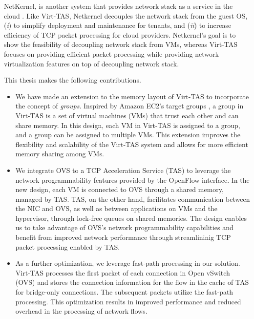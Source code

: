 NetKernel, is another system that provides network stack as a service in the cloud
\cite{niu2021netkernel, niu2017network}.
Like Virt-TAS, Netkernel decouples the network stack from the guest OS, 
(\emph{i}) to simplify deployment and maintenance for tenants, and (\emph{ii}) to increase  
efficiency of TCP packet processing for cloud providers. Netkernel's 
goal is to show the feasibility of decoupling network stack from VMs, whereas Virt-TAS
focuses on providing efficient packet processing while providing network virtualization 
features on top of decoupling network stack.

This thesis makes the following contributions.
\begin{itemize}
    \item 
    We have made an extension to the memory layout of Virt-TAS to incorporate the 
    concept of \emph{groups}. Inspired by Amazon EC2's target groups \cite{ec2target}
    , a group in Virt-TAS is a set of virtual machines (VMs) that trust each other and 
    can share memory. In this design, each VM in Virt-TAS is assigned to a group, 
    and a group can be assigned to multiple VMs. This extension improves the flexibility 
    and scalability of the Virt-TAS system and allows for more efficient memory sharing
     among VMs.

    \item We integrate OVS to a TCP Acceleration Service (TAS) to leverage the 
    network programmability features provided by the OpenFlow interface. In the new design,
    each VM is connected to OVS through a shared memory, managed by TAS.
    TAS, on the other hand, facilitates communication between the NIC and OVS, as well as 
    between applications on VMs and the hypervisor, through lock-free queues on shared memories.
    The design enables us to take advantage 
    of OVS's network programmability capabilities and benefit from improved network performance 
    through streamlininig TCP packet processing enabled by TAS.

    \item As a further optimization, we leverage fast-path processing in our solution. 
    Virt-TAS processes the first packet of each connection in Open vSwitch (OVS) and 
    stores the connection information for the flow in the cache of TAS for bridge-only 
    connections. The subsequent packets utilize the fast-path processing. 
    This optimization results in improved performance and reduced overhead in 
    the processing of network flows. 

\end{itemize}

